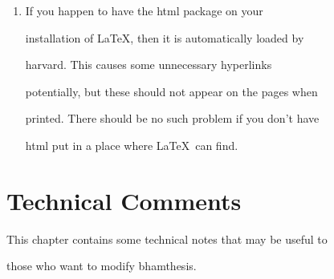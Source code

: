 \documentclass{bhamthesis}
\newcommand{\clsname}{\pkg{bhamthesis}}
\newcommand{\pkg}[1]{\textsf{#1}}
\begin{document}
\begin{enumerate}
 Fortunately, this doesn't stop pdf\TeX\ from running, and the

 output looks fine.  Moreover, there isn't such a problem with

 \LaTeX\ as far as I am aware of.  Alternatively, use

 \texttt{dvi2pdf}.

\item If you happen to have the \pkg{html} package on your

 installation of \LaTeX, then it is automatically loaded by

 \pkg{harvard}.  This causes some unnecessary hyperlinks

 potentially, but these should not appear on the pages when

 printed.  There should be no such problem if you don't have

 \pkg{html} put in a place where \LaTeX\ can find.

\end{enumerate}





\appendix

\chapter*{Technical Comments}

This chapter contains some technical notes that may be useful to

those who want to modify \clsname.
\end{document}
